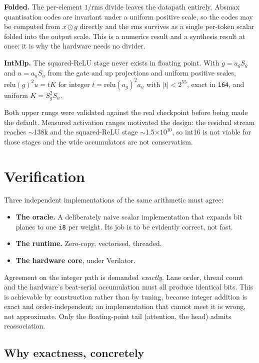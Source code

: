 \documentclass[10pt,twocolumn]{article}
\begin{document}
\textbf{Folded.} The per-element $1/\text{rms}$ divide leaves the datapath
entirely. Absmax quantisation codes are invariant under a uniform positive
scale, so the codes may be computed from $x \odot g$ directly and the rms
survives as a single per-token scalar folded into the output scale. This is a
numerics result and a synthesis result at once: it is why the hardware needs no
divider.

\textbf{IntMlp.} The squared-ReLU stage never exists in floating point. With
$g = a_g S_g$ and $u = a_u S_u$ from the gate and up projections and uniform
positive scales, $\mathrm{relu}(g)^2 u = t K$ for integer
$t = \mathrm{relu}(a_g)^2 a_u$ with $|t| < 2^{55}$, exact in \texttt{i64}, and
uniform $K = S_g^2 S_u$.

Both upper rungs were validated against the real checkpoint before being made
the default. Measured activation ranges motivated the design: the residual
stream reaches $\sim$138k and the squared-ReLU stage $\sim$1.5$\times10^{10}$,
so int16 is not viable for those stages and the wide accumulators are not
conservatism.

\section{Verification}
\label{sec:verification}

Three independent implementations of the same arithmetic must agree:

\begin{itemize}
\item \textbf{The oracle.} A deliberately naive scalar implementation that
      expands bit planes to one \texttt{i8} per weight. Its job is to be
      evidently correct, not fast.
\item \textbf{The runtime.} Zero-copy, vectorised, threaded.
\item \textbf{The hardware core}, under Verilator.
\end{itemize}

Agreement on the integer path is demanded \emph{exactly}. Lane order, thread
count and the hardware's beat-serial accumulation must all produce identical
bits. This is achievable by construction rather than by tuning, because integer
addition is exact and order-independent; an implementation that cannot meet it
is wrong, not approximate. Only the floating-point tail (attention, the head)
admits reassociation.

\subsection{Why exactness, concretely}
\end{document}
